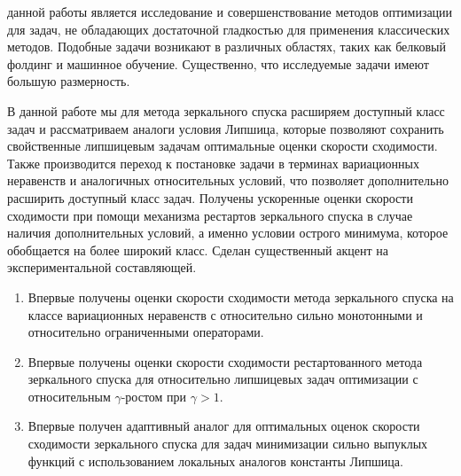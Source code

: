 
{\aim}  данной работы является исследование и совершенствование методов оптимизации для задач, не обладающих достаточной гладкостью для применения классических методов. Подобные задачи возникают в различных областях, таких как белковый фолдинг и машинное обучение. Существенно, что исследуемые задачи имеют большую размерность. 


В данной работе мы для метода зеркального спуска расширяем доступный класс задач и рассматриваем аналоги условия Липшица, которые позволяют сохранить свойственные липшицевым задачам оптимальные оценки скорости сходимости. Также производится переход к постановке задачи в терминах вариационных неравенств и аналогичных относительных условий, что позволяет дополнительно расширить доступный класс задач. Получены ускоренные оценки скорости сходимости при помощи механизма рестартов зеркального спуска в случае наличия дополнительных условий, а именно условии острого минимума, которое обобщается на более широкий класс. Сделан существенный акцент на экспериментальной составляющей.

{\novelty}
\begin{enumerate}[beginpenalty=10000] %
  \item Впервые получены оценки скорости сходимости метода зеркального спуска на классе вариационных неравенств с относительно сильно монотонными и относительно ограниченными операторами. 
  \item Впервые получены оценки скорости сходимости рестартованного метода зеркального спуска для относительно липшицевых задач оптимизации с относительным $\gamma$-ростом при $\gamma > 1$. 
  \item Впервые получен адаптивный аналог для оптимальных оценок скорости сходимости зеркального спуска для задач минимизации сильно выпуклых функций с использованием локальных аналогов константы Липшица. 
\end{enumerate}

